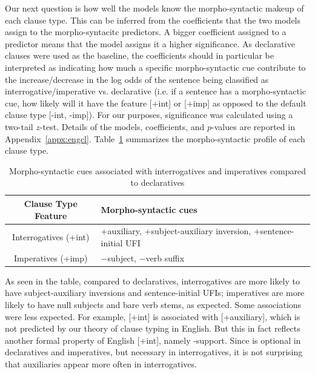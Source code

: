 
Our next question is how well the models know the morpho-syntactic makeup of each clause type. This can be inferred from the coefficients that the two models assign to the morpho-syntacitc predictors. A bigger coefficient assigned to a predictor means that the model assigns it a higher significance. As declarative clauses were used as the baseline, the coefficients should in particular be interpreted as indicating how much a specific morpho-syntactic cue contribute to the increase/decrease in the log odds of the sentence being classified as interrogative/imperative vs. declarative (i.e. if a sentence has a morpho-syntactic cue, how likely will it have the feature [+int] or [+imp] as opposed to the default clause type [-int, -imp]). For our purposes, significance was calculated using a two-tail $z$-test. Details of the models, coefficients, and $p$-values are reported in Appendix~\ref{appx:engcl}. Table~\ref{tab:engcl:corpus:formal} summarizes the morpho-syntactic profile of each clause type.

\begin{table}[H]
\begin{center}
\begin{tabular}{c|p{10cm}}
\hline
Clause Type Feature & Morpho-syntactic cues\\
\hline \hline
Interrogatives (+int) & +auxiliary, +subject-auxiliary inversion, +sentence-initial UFI\\
\hline
Imperatives (+imp) & $-$subject, $-$verb suffix\\
\hline \hline
\end{tabular}
\end{center}
\caption{Morpho-syntactic cues associated with interrogatives and imperatives compared to declaratives}
\label{tab:engcl:corpus:formal}
\end{table}%


As seen in the table, compared to declaratives, interrogatives are more likely to have subject-auxiliary inversions and sentence-initial UFIs; imperatives are more likely to have null subjects and bare verb stems, as expected. Some associations were less expected. For example, [+int] is associated with [+auxiliary], which is not predicted by our theory of clause typing in English. But this in fact reflects another formal property of English [+int], namely -support. Since  is optional in declaratives and imperatives, but necessary in interrogatives, it is not surprising that auxiliaries appear more often in interrogatives. 

